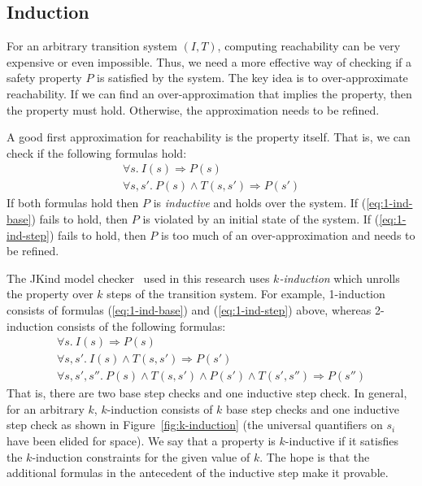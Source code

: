 \subsection{Induction}
\label{sec:induction}
For an arbitrary transition system $(I, T)$, computing reachability
can be very expensive or even impossible. Thus, we need a more
effective way of checking if a safety property $P$ is satisfied by the
system. The key idea is to over-approximate reachability. If we can
find an over-approximation that implies the property, then the
property must hold. Otherwise, the approximation needs to be refined.

A good first approximation for reachability is the property itself.
That is, we can check if the following formulas hold:
\begin{gather}
  \forall s.~ I(s) \Rightarrow P(s)
  \label{eq:1-ind-base} \\
  \forall s, s'.~ P(s) \land T(s, s') \Rightarrow P(s')
  \label{eq:1-ind-step}
\end{gather}
If both formulas hold then $P$ is {\em inductive} and holds over the
system. If (\ref{eq:1-ind-base}) fails to hold, then $P$ is violated
by an initial state of the system. If (\ref{eq:1-ind-step}) fails to
hold, then $P$ is too much of an over-approximation and needs to be
refined.

The JKind model checker~\cite{2017arXiv171201222G} used in this research uses {\em
  $k$-induction} which unrolls the property over $k$ steps of the
transition system. For example, 1-induction consists of formulas
(\ref{eq:1-ind-base}) and (\ref{eq:1-ind-step}) above, whereas
2-induction consists of the following formulas:
\begin{gather*}
\forall s.~ I(s) \Rightarrow P(s) \\
\forall s, s'.~ I(s) \land T(s, s') \Rightarrow P(s') \\
\forall s, s', s''.~ P(s) \land T(s, s') \land P(s') \land T(s',
  s'') \Rightarrow P(s'')
\end{gather*}
That is, there are two base step checks and one inductive step check.
In general, for an arbitrary $k$, $k$-induction consists of $k$
base step checks and one inductive step check as shown in
Figure~\ref{fig:k-induction} (the universal quantifiers on $s_i$ have
been elided for space). We say that a property is $k$-inductive if it
satisfies the $k$-induction constraints for the given value of $k$.
The hope is that the additional formulas in the antecedent of the
inductive step make it provable.

